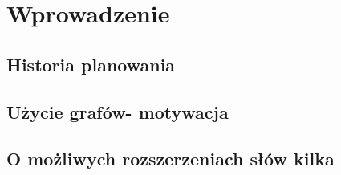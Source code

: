 \chapter{Wprowadzenie}
\thispagestyle{chapterBeginStyle}
\label{rozdzial1}
\section{Historia planowania}
\section{Użycie grafów- motywacja}
\section{O możliwych rozszerzeniach słów kilka}



